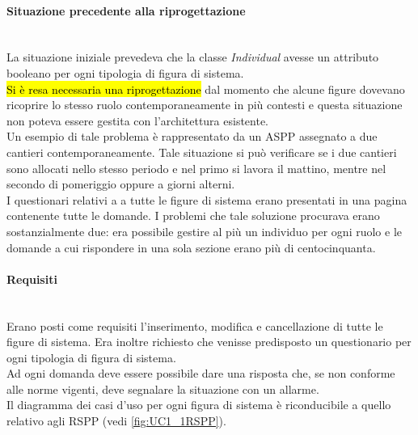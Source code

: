 	\paragraph*{Situazione precedente alla riprogettazione} \mbox{} \\
	
	La situazione iniziale prevedeva che la classe \textit{Individual} avesse  un attributo booleano per ogni tipologia di figura di sistema. \\
	\hl{Si è resa necessaria una riprogettazione} dal momento che alcune figure dovevano ricoprire lo stesso ruolo contemporaneamente in più contesti e questa situazione non poteva essere gestita con l'architettura esistente. \\
	Un esempio di tale problema è rappresentato da un ASPP assegnato a due cantieri contemporaneamente. Tale situazione si può verificare se i due cantieri sono allocati nello stesso periodo e nel primo si lavora il mattino, mentre nel secondo di pomeriggio oppure a giorni alterni.\\
	I questionari relativi a a tutte le figure di sistema erano presentati in una pagina contenente tutte le domande. I problemi che tale soluzione procurava erano sostanzialmente due: era possibile gestire al più un individuo per ogni ruolo e le domande a cui rispondere in una sola sezione erano più di centocinquanta.
	
	\paragraph*{Requisiti}\mbox{} \\
	Erano posti come requisiti l'inserimento, modifica e cancellazione di tutte le figure di sistema. Era inoltre richiesto che venisse predisposto un questionario per ogni tipologia di figura di sistema. \\
	Ad ogni domanda deve essere possibile dare una risposta che, se non conforme alle norme vigenti, deve segnalare la situazione con un allarme.\\
	Il diagramma dei casi d'uso per ogni figura di sistema è riconducibile a quello relativo agli RSPP (vedi  \autoref{fig:UC1_1RSPP}).

